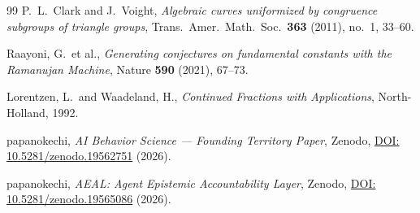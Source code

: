\documentclass[12pt]{amsart}
\begin{document}
\begin{thebibliography}{99}
  P.~L.~Clark and J.~Voight,
  \textit{Algebraic curves uniformized by
  congruence subgroups of triangle groups},
  Trans.\ Amer.\ Math.\ Soc.\
  \textbf{363} (2011), no.~1, 33--60.

  Raayoni, G.\ et al.,
  \textit{Generating conjectures on fundamental
  constants with the Ramanujan Machine},
  Nature \textbf{590} (2021), 67--73.

  Lorentzen, L.\ and Waadeland, H.,
  \textit{Continued Fractions with
  Applications}, North-Holland, 1992.

  papanokechi,
  \textit{AI Behavior Science --- 
  Founding Territory Paper},
  Zenodo,
  \href{https://doi.org/10.5281/zenodo.19562751}{%
  DOI: 10.5281/zenodo.19562751} (2026).

  papanokechi,
  \textit{AEAL: Agent Epistemic
  Accountability Layer},
  Zenodo,
  \href{https://doi.org/10.5281/zenodo.19565086}{%
  DOI: 10.5281/zenodo.19565086} (2026).

\end{thebibliography}
\end{document}
